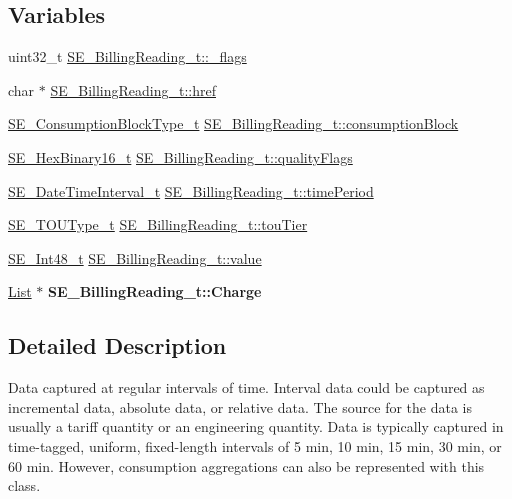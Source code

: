 \subsection*{Variables}
\begin{DoxyCompactItemize}
\item 
uint32\+\_\+t \hyperlink{group__BillingReading_ga347586ffe6481f13ef2a86ae5c2802f1}{S\+E\+\_\+\+Billing\+Reading\+\_\+t\+::\+\_\+flags}
\item 
char $\ast$ \hyperlink{group__BillingReading_gaefb40f15330576c4cf4dcdbf218648a1}{S\+E\+\_\+\+Billing\+Reading\+\_\+t\+::href}
\item 
\hyperlink{group__ConsumptionBlockType_ga526f797922e4c3009d50c28f457c462e}{S\+E\+\_\+\+Consumption\+Block\+Type\+\_\+t} \hyperlink{group__BillingReading_gafcecb5b014f7cd87df8944a0c04c4205}{S\+E\+\_\+\+Billing\+Reading\+\_\+t\+::consumption\+Block}
\item 
\hyperlink{group__HexBinary16_gac040be0e918a360be6bcf5e8b8ad2c49}{S\+E\+\_\+\+Hex\+Binary16\+\_\+t} \hyperlink{group__BillingReading_ga2d2f8b1f807f992cd505186820b6cea2}{S\+E\+\_\+\+Billing\+Reading\+\_\+t\+::quality\+Flags}
\item 
\hyperlink{structSE__DateTimeInterval__t}{S\+E\+\_\+\+Date\+Time\+Interval\+\_\+t} \hyperlink{group__BillingReading_gaf005e1ec874e2c47b377b1920e8dabba}{S\+E\+\_\+\+Billing\+Reading\+\_\+t\+::time\+Period}
\item 
\hyperlink{group__TOUType_gadcfd871f87df34ae8228b9484ebedc6a}{S\+E\+\_\+\+T\+O\+U\+Type\+\_\+t} \hyperlink{group__BillingReading_gad7e3baa3bf7a76797bb28792a2a02dd8}{S\+E\+\_\+\+Billing\+Reading\+\_\+t\+::tou\+Tier}
\item 
\hyperlink{group__Int48_ga87620025dc9f6c732fa48fcab95861ce}{S\+E\+\_\+\+Int48\+\_\+t} \hyperlink{group__BillingReading_gabd07007bfa337e4ff2dddde3c86b93ce}{S\+E\+\_\+\+Billing\+Reading\+\_\+t\+::value}
\item 
\mbox{\label{group__BillingReading_ga8529abcb26b3af64b5acfd61fc64ab27}} 
\hyperlink{structList}{List} $\ast$ {\bfseries S\+E\+\_\+\+Billing\+Reading\+\_\+t\+::\+Charge}
\end{DoxyCompactItemize}


\subsection{Detailed Description}
Data captured at regular intervals of time. Interval data could be captured as incremental data, absolute data, or relative data. The source for the data is usually a tariff quantity or an engineering quantity. Data is typically captured in time-\/tagged, uniform, fixed-\/length intervals of 5 min, 10 min, 15 min, 30 min, or 60 min. However, consumption aggregations can also be represented with this class. 

